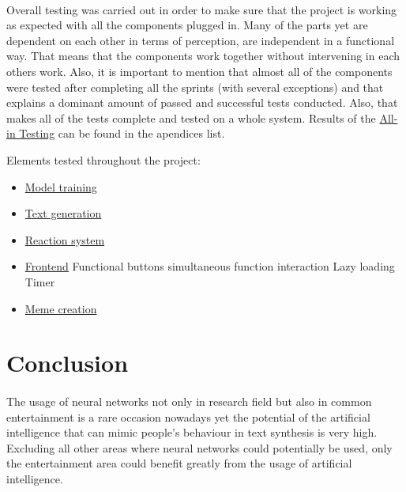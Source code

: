 \documentclass[12pt]{report}
\begin{document}
\paragraph{}
Overall testing was carried out in order to make sure that the project is working as expected with all the components plugged in.
Many of the parts yet are dependent on each other in terms of perception, are independent in a functional way. That means that 
the components work together without intervening in each others work. Also, it is important to mention that almost all of the components
were tested after completing all the sprints (with several exceptions) and that explains a dominant amount of passed and successful tests
conducted. Also, that makes all of the tests complete and tested on a whole system. Results of the \hyperref[appendix:all-in_testing]{All-in Testing}
can be found in the apendices list.

Elements tested throughout the project:
\begin{itemize}
  \item \hyperref[sec:model_testing]{Model training}
  \item \hyperref[appendix:model_testing]{Text generation}
  \item \hyperref[appendix:reaction_system_testing]{Reaction system}
  \item \hyperref[appendix:frontend_testing]{Frontend}
  \subitem Functional buttons
  \subitem simultaneous function interaction
  \subitem Lazy loading
  \subitem Timer
  \item \hyperref[appendix:meme_creation_testing]{Meme creation}
\end{itemize}

\clearpage

\section*{Conclusion}
\paragraph{}
The usage of neural networks not only in research field but also in common entertainment is a rare occasion nowadays yet the potential of 
the artificial intelligence that can mimic people's behaviour in text synthesis is very high. Excluding all other areas where neural networks
could potentially be used, only the entertainment area could benefit greatly from the usage of artificial intelligence. 
\end{document}
